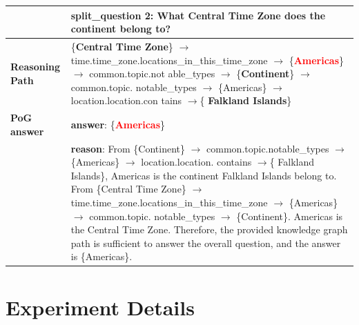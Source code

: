 \begin{table}[]
\begin{tabularx}{0.9\textwidth}{@{}p{3cm}X@{}}
& split\_question 2: What Central Time Zone does the continent belong to?\\
\toprule
\textbf{Reasoning Path} &\{\textbf{Central Time Zone}\} $\rightarrow$ time.time\_zone.locations\_in\_this\_time\_zone $\rightarrow$ \{\textcolor{red}{\textbf{Americas}}\} $\rightarrow$ common.topic.not able\_types  $\rightarrow$ \{\textbf{Continent}\} $\rightarrow$ common.topic. notable\_types  $\rightarrow$ \{Americas\} $\rightarrow$ location.location.con tains  $\rightarrow$\{ \textbf{Falkland Islands}\}\\
\toprule
\textbf{PoG answer} & 
\textbf{answer}: \{\textcolor{red}{\textbf{Americas}}\} \\

 & \textbf{reason}: From \{Continent\} $\rightarrow$ common.topic.notable\_types  $\rightarrow$ \{Americas\} $\rightarrow$ location.location. contains  $\rightarrow$\{ Falkland Islands\}, Americas  is the continent Falkland Islands belong to.
From \{Central Time Zone\} $\rightarrow$ time.time\_zone.locations\_in\_this\_time\_zone $\rightarrow$ \{Americas\} $\rightarrow$ common.topic. notable\_types  $\rightarrow$ \{Continent\}. Americas is the Central Time Zone.
Therefore, the provided knowledge graph path is sufficient to answer the overall question, and the answer is \{Americas\}.
\\

\bottomrule
\end{tabularx}
\end{table}


\newpage
\section{Experiment Details}
\label{appen:dataset_details}


